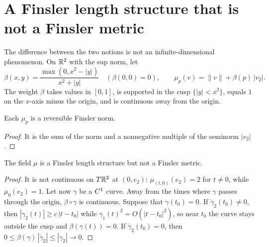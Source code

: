 \section{A Finsler length structure that is not a Finsler metric}
\label{sec:mt-cusp}

The difference between the two notions is not an infinite-dimensional phenomenon. On $\mathbb{R}^2$ with
the sup norm, let
\[
  \beta(x, y) = \frac{\max(0, x^2 - |y|)}{x^2 + |y|} \quad (\beta(0,0) = 0), \qquad
  \mu_p(v) = \|v\| + \beta(p)\,|v_2| .
\]
The weight $\beta$ takes values in $[0,1]$, is supported in the cusp $\{|y| < x^2\}$, equals $1$
on the $x$-axis minus the origin, and is continuous away from the origin.

\begin{proposition}
  \label{prop:mt-cusp-fibers}
  \leanok
  Each $\mu_p$ is a reversible Finsler norm.
\end{proposition}

\begin{proof}
  \leanok
  It is the sum of the norm and a nonnegative multiple of the seminorm $|v_2|$.
\end{proof}

\begin{theorem}
  \label{thm:mt-cusp}
  \leanok
  The field $\mu$ is a Finsler length structure but not a Finsler metric.
\end{theorem}

\begin{proof}
  \leanok
  It is not continuous on $T\mathbb{R}^2$ at $(0, e_2)$: $\mu_{(t,0)}(e_2) = 2$ for $t \neq 0$, while
  $\mu_0(e_2) = 1$. Let now $\gamma$ be a $C^{1}$ curve. Away from the times where $\gamma$ passes
  through the origin, $\beta \circ \gamma$ is continuous. Suppose that $\gamma(t_0) = 0$. If
  $\dot\gamma_2(t_0) \neq 0$, then $|\gamma_2(t)| \ge c\,|t - t_0|$ while $\gamma_1(t)^2 =
  O(|t-t_0|^2)$, so near $t_0$ the curve stays outside the cusp and $\beta(\gamma(t)) = 0$. If
  $\dot\gamma_2(t_0) = 0$, then $0 \le \beta(\gamma)\,|\dot\gamma_2| \le |\dot\gamma_2| \to 0$.
\end{proof}

